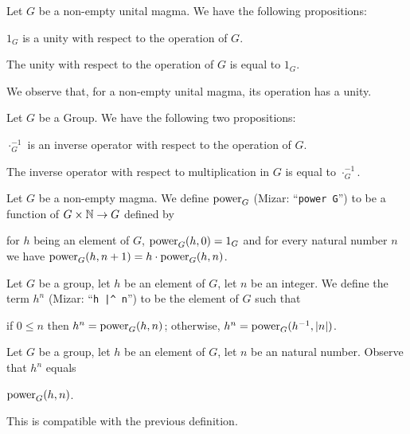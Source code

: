 \documentclass{article}
\begin{document}
Let $G$ be a non-empty unital magma. We have the following propositions:
\begin{thm}
\item\label{group1:21} $1_{G}$ is a unity with respect to the operation
  of $G$.
\item\label{group1:22} The unity with respect to the operation of $G$ is
  equal to $1_{G}$.
\end{thm}

We observe that, for a non-empty unital magma, its operation has a
unity.

Let $G$ be a Group. We have the following two propositions:
\begin{thm}
\item\label{group1:23} $\cdot_{G}^{-1}$ is an inverse operator with
  respect to the operation of $G$.
\item\label{group1:24} The inverse operator with respect to
  multiplication in $G$ is equal to $\cdot_{G}^{-1}$.
\end{thm}

\begin{definition}
Let $G$ be a non-empty magma. We define $\operatorname{power}_{G}$ (Mizar:
``\verb#power G#'') to be a function of
$G\times\mathbb{N}\to G$ defined by
\begin{defn}
\item for $h$ being an element of $G$, $\operatorname{power}_{G}(h,0)=1_{G}$ and for
  every natural number $n$ we have $\operatorname{power}_{G}(h,n+1)=h\cdot\operatorname{power}_{G}(h,n)$.
\end{defn}
\end{definition}

\begin{definition}
Let $G$ be a group, let $h$ be an element of $G$, let $n$ be an integer.
We define the term $h^{n}$ (Mizar: ``\verb#h |^ n#'') to be the element
of $G$ such that
\begin{defn}
\item if $0\leq n$ then $h^{n}=\operatorname{power}_{G}(h,n)$; otherwise, $h^{n}=\operatorname{power}_{G}(h^{-1},|n|)$.
\end{defn}
\end{definition}

\begin{definition}
Let $G$ be a group, let $h$ be an element of $G$, let $n$ be an natural
number. Observe that $h^{n}$ equals
\begin{defn}
\item $\operatorname{power}_{G}(h,n)$.
\end{defn}
This is compatible with the previous definition.
\end{definition}
\end{document}
